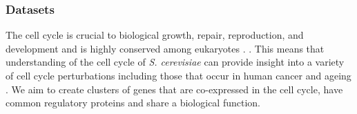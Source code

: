 \documentclass{bmcart}
\begin{document}
\subsubsection*{Datasets}
The cell cycle is crucial to biological growth, repair, reproduction, and development \citep{tyson2013cell, chen2004integrative, alberts2018molecular} and is highly conserved among eukaryotes \citep{alberts2018molecular}. . This means that understanding of the cell cycle of \emph{S. cerevisiae} can provide insight into a variety of cell cycle perturbations including those that occur in human cancer \citep{ingalls2007systems, chen2004integrative} and ageing \citep{jimenez2015live}.
We aim to create clusters of genes that are co-expressed in the cell cycle, have common regulatory proteins and share a biological function. 
\end{document}
